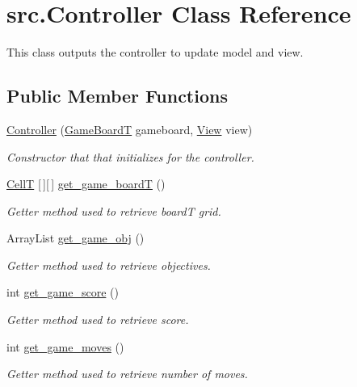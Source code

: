 \hypertarget{classsrc_1_1Controller}{}\section{src.\+Controller Class Reference}
\label{classsrc_1_1Controller}


This class outputs the controller to update model and view.  


\subsection*{Public Member Functions}
\begin{DoxyCompactItemize}
\item 
\hyperlink{classsrc_1_1Controller_aeff9a0c7be01117a7ee1a3029d908b92}{Controller} (\hyperlink{classsrc_1_1GameBoardT}{Game\+BoardT} gameboard, \hyperlink{classsrc_1_1View}{View} view)
\begin{DoxyCompactList}\small\item\em Constructor that that initializes for the controller. \end{DoxyCompactList}\item 
\hyperlink{enumsrc_1_1CellT}{CellT} \mbox{[}$\,$\mbox{]}\mbox{[}$\,$\mbox{]} \hyperlink{classsrc_1_1Controller_af977f21ac362867f8a347b18a3daab74}{get\+\_\+game\+\_\+boardT} ()
\begin{DoxyCompactList}\small\item\em Getter method used to retrieve boardT grid. \end{DoxyCompactList}\item 
Array\+List \hyperlink{classsrc_1_1Controller_a8d1999a35f647370310918dbe75597d8}{get\+\_\+game\+\_\+obj} ()
\begin{DoxyCompactList}\small\item\em Getter method used to retrieve objectives. \end{DoxyCompactList}\item 
int \hyperlink{classsrc_1_1Controller_a00df1a90b7ef485f2715e23df920aee4}{get\+\_\+game\+\_\+score} ()
\begin{DoxyCompactList}\small\item\em Getter method used to retrieve score. \end{DoxyCompactList}\item 
int \hyperlink{classsrc_1_1Controller_adea400edf10a1561c5832f86a81d805b}{get\+\_\+game\+\_\+moves} ()
\begin{DoxyCompactList}\small\item\em Getter method used to retrieve number of moves. \end{DoxyCompactList}\item 

\end{DoxyCompactItemize}
